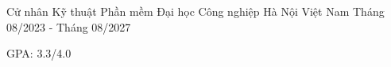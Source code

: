 \begin{cventries} %
  \cventry
    {Cử nhân Kỹ thuật Phần mềm} %
    {Đại học Công nghiệp Hà Nội} %
    {Việt Nam} %
    {Tháng 08/2023 - Tháng 08/2027} %
    {
      \begin{cvitems} %
        \item {GPA: 3.3/4.0}
      \end{cvitems}
    }
\end{cventries}
